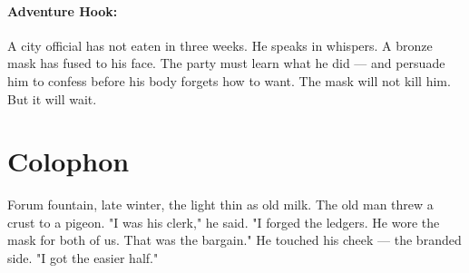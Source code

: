 \paragraph{Adventure Hook:}
A city official has not eaten in three weeks. He speaks in whispers. A bronze mask has fused to his face. The party must learn what he did — and persuade him to confess before his body forgets how to want. The mask will not kill him. But it will wait.

\section*{Colophon}
Forum fountain, late winter, the light thin as old milk. The old man threw a crust to a pigeon. "I was his clerk," he said. "I forged the ledgers. He wore the mask for both of us. That was the bargain." He touched his cheek — the branded side. "I got the easier half."